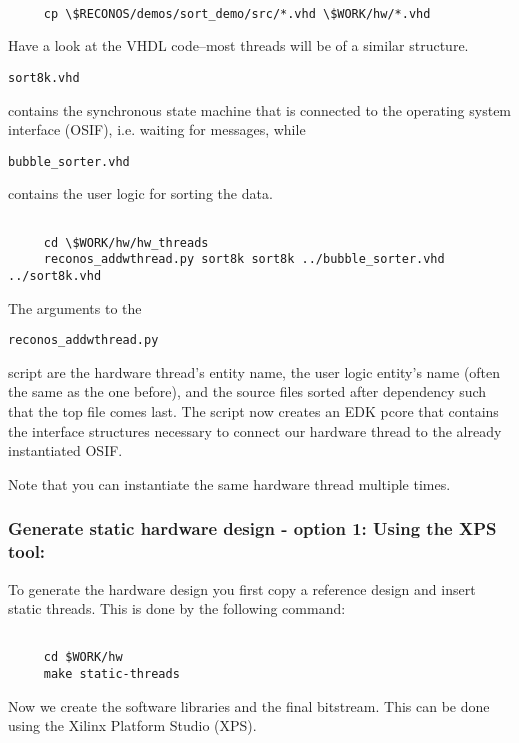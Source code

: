 \documentclass[DIV15,a4paper]{scrartcl}
\begin{document}
\begin{verbatim}

     cp \$RECONOS/demos/sort_demo/src/*.vhd \$WORK/hw/*.vhd

\end{verbatim}
     
Have a look at the VHDL code--most threads will be of a similar structure. \begin{verbatim}sort8k.vhd\end{verbatim} contains the synchronous state machine
that is connected to the operating system interface (OSIF), i.e. waiting for messages,
while \begin{verbatim}bubble_sorter.vhd\end{verbatim} contains the user logic
for sorting the data.

\begin{verbatim}

     cd \$WORK/hw/hw_threads
     reconos_addwthread.py sort8k sort8k ../bubble_sorter.vhd ../sort8k.vhd

\end{verbatim}
     
The arguments to the \begin{verbatim}reconos_addwthread.py\end{verbatim} script are the hardware thread's entity name,
the user logic entity's name (often the same as the one before), and the source files sorted after dependency such that the
top file comes last. The script now creates an EDK pcore that contains the interface structures necessary to connect our
hardware thread to the already instantiated OSIF.

Note that you can instantiate the same hardware thread multiple times.

\subsubsection*{Generate static hardware design - option 1: Using the XPS tool:}

To generate the hardware design you first copy a reference design and insert static threads. This is done by the following command:

\begin{verbatim}

     cd $WORK/hw
     make static-threads

\end{verbatim}
     
Now we create the software libraries and the final bitstream. This can be done using the Xilinx Platform Studio (XPS).
\end{document}

